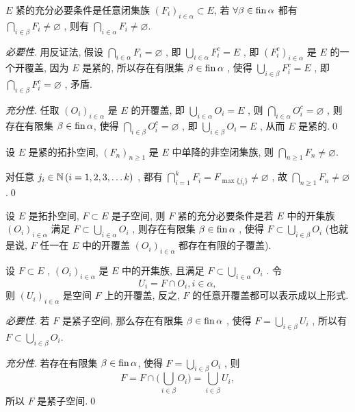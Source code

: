     \begin{Proposition}\label{prop:紧性的另一刻画}
         $ E $ 紧的充分必要条件是任意闭集族 $ (F_{i})_{i\in\alpha}\subset E $, 若 $ \forall \beta\in\operatorname{fin}\alpha $ 都有 $ \bigcap_{i\in\beta}F_{i}\neq \varnothing $ , 则有 $ \bigcap_{i\in\alpha}F_{i}\neq\varnothing $.
    \end{Proposition}

    \begin{Proof}
        \textsl{必要性}. 用反证法, 假设 $ \bigcap_{i\in\alpha}F_{i}=\varnothing $ , 即 $ \bigcup_{i\in\alpha}F_{i}^{c}=E $ , 即 $ (F_{i}^{c})_{i\in\alpha} $ 是 $ E $ 的一个开覆盖, 因为 $ E $ 是紧的,  所以存在有限集 $ \beta\in\operatorname{fin}\alpha $ ,  使得 $ \bigcup_{i\in\beta}F_{i}^{c}=E $ , 即 $ \bigcap_{i\in\beta}F_{i}^{c}=\varnothing $ , 矛盾.

        \textsl{充分性}. 任取 $ (O_{i})_{i\in\alpha} $ 是 $ E $ 的开覆盖, 即 $ \bigcup_{i\in\alpha}O_{i}=E $ , 则 $ \bigcap_{i\in\alpha}O_{i}^{c}=\varnothing $ , 则存在有限集 $ \beta\in\operatorname{fin} \alpha $, 使得 $ \bigcap_{i\in\beta}O_{i}^{c}=\varnothing $ , 即 $ \bigcup_{i\in\beta}O_{i}=E $ , 从而 $ E $ 是紧的.\qed
    \end{Proof}

    \begin{Proposition}
        设 $ E $ 是紧的拓扑空间, $ (F_{n})_{n\geqslant1} $ 是 $ E $ 中单降的非空闭集族, 则 $ \bigcap_{n\geqslant1}F_{n}\neq\varnothing $.
    \end{Proposition}

    \begin{Proof}
        对任意 $ j_{i}\in\mathbb{N}\,(i=1, 2, 3,\dots k) $ , 都有 $ \bigcap_{i=1}^{k}F_{i}=F_{\max\{ j_{i} \}}\neq\varnothing $ , 故 $ \bigcap_{n\geqslant1}F_{n}\neq\varnothing $ .\qed
    \end{Proof}

    \begin{Theorem}
         设 $ E $ 是拓扑空间,  $ F\subset E $ 是子空间, 则 $ F $ 紧的充分必要条件是若 $ E $ 中的开集族 $ (O_{i})_{i\in\alpha} $ 满足 $ F\subset \bigcup_{i\in\alpha}O_{i} $ , 则存在有限集 $ \beta\in\operatorname{fin}\alpha $ , 使得 $ F\subset\bigcup_{i\in\beta}O_{i} $ (也就是说, $ F $ 任一在 $ E $ 中的开覆盖 $ (O_{i})_{i\in\alpha} $ 都存在有限的子覆盖).
    \end{Theorem}

    \begin{Proof}
        设 $ F\subset E $ , $ (O_{i})_{i\in\alpha} $ 是 $ E $ 中的开集族, 且满足 $ F\subset \bigcup_{i\in\alpha}O_{i} $ . 令
        \[
            U_{i}=F\cap O_{i}, i\in\alpha,
        \]
        则 $ (U_{i})_{i\in\alpha} $ 是空间 $ F $ 上的开覆盖, 反之,  $ F $ 的任意开覆盖都可以表示成以上形式.

        \textsl{必要性}. 若 $ F $ 是紧子空间, 那么存在有限集 $ \beta\in\operatorname{fin}\alpha $ , 使得 $ F=\bigcup_{i\in\beta}U_{i} $ , 所以有 $ F\subset\bigcup_{i\in\beta}O_{i} $.

        \textsl{充分性}. 若存在有限集 $ \beta\in\operatorname{fin}\alpha $, 使得 $ F=\bigcup_{i\in\beta}O_{i} $ , 则
        \[
            F=F\cap\bigg( \bigcup_{i\in\beta}O_{i} \bigg)=\bigcup_{i\in\beta}U_{i},
        \]
        所以 $ F $ 是紧子空间.\qed
    \end{Proof}

